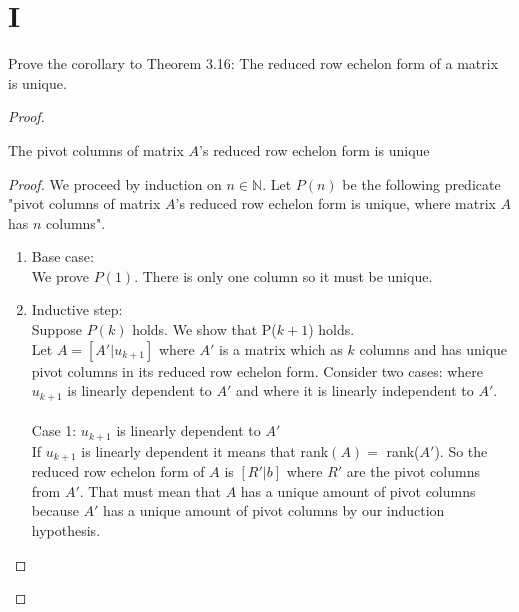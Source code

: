 \documentclass[11pt]{scrartcl}
\begin{document}
\section{I} 
Prove the corollary to Theorem 3.16: The reduced row echelon form of a matrix is unique.
\begin{proof}
	\begin{lemma}
		The pivot columns of matrix $A$'s reduced row echelon form is unique
		\begin{proof}
			We proceed by induction on $n \in \mathbb{N}$. Let $P(n)$ be the following predicate 
			"pivot columns of matrix $A$'s reduced row echelon form is unique, where matrix $A$ has $n$ columns".
			\begin{enumerate}[label=\alph*.]
				\item{
					Base case:\\
					We prove $P(1)$.
					There is only one column so it must be unique.
				}
				\item{
					Inductive step:\\
					Suppose $P(k)$ holds. 
					We show that P($k+1$) holds.\\
					Let $A = [A'|u_{k+1}]$ where $A'$ is a matrix which as $k$ columns and has unique pivot columns in its reduced row echelon form.
					Consider two cases: where $u_{k+1}$ is linearly dependent to $A'$ and where it is linearly independent to $A'$.\\\-\\
					Case 1: $u_{k+1}$ is linearly dependent to $A'$\\
					If $u_{k+1}$ is linearly dependent it means that rank$(A) = $ rank($A'$). So the reduced row echelon form of $A$ is 
					$[R'|b]$ where $R'$ are the pivot columns from $A'$. That must mean that $A$ has a unique amount of pivot columns because $A'$
					has a unique amount of pivot columns by our induction hypothesis.\-\\
	
}
\end{enumerate}
\end{proof}
\end{lemma}
\end{proof}
\end{document}
